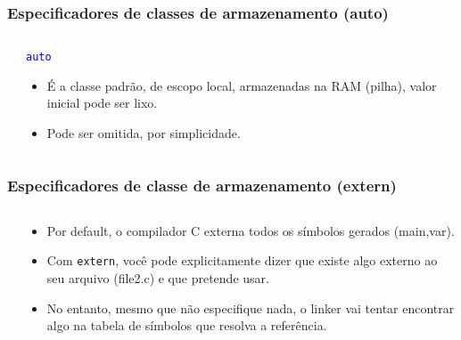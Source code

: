 \documentclass{beamer}
\begin{document}
\begin{frame}
	\frametitle{Especificadores de classes de armazenamento (auto)}
\begin{columns}[T] %
	\begin{column}{.55\textwidth}
		
	\end{column}%
	\hfill%
	\begin{column}{.45\textwidth}
		\begin{center}
			\texttt{\textcolor{blue}{auto}}
		\end{center}
		\vspace*{0.5cm}
		\begin{itemize}
			\item É a classe padrão, de escopo local, armazenadas na RAM (pilha), valor inicial pode ser lixo.
			\item Pode ser omitida, por simplicidade.
		\end{itemize}
	\end{column}%
\end{columns}
\end{frame}

\begin{frame}
	\frametitle{Especificadores de classe de armazenamento (extern)}
	\begin{columns}[T] %
		\begin{column}{.57\textwidth}
			
			
		\end{column}%
		\hfill%
		\begin{column}{.43\textwidth}
			\begin{itemize}
				\item Por default, o compilador C externa todos os símbolos gerados (main,var).
				\item Com \texttt{extern}, você pode explicitamente dizer que existe algo externo ao seu arquivo (file2.c) e que pretende usar.
			\item No entanto, mesmo que não especifique nada, o linker vai tentar encontrar algo na tabela de símbolos que resolva a referência.
			\end{itemize}
		\end{column}%
	\end{columns}
\end{frame}
\end{document}
